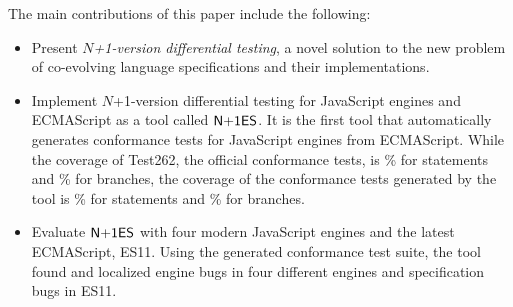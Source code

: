 The main contributions of this paper include the following:
\begin{itemize}
  \item Present \textit{$N$+1-version differential testing}, a novel solution to the new
    problem of co-evolving language specifications and their implementations.
  \item Implement $N$+1-version differential testing for JavaScript engines and
    ECMAScript as a tool called $\text{\sf N+1ES}$. It is the first tool that automatically generates conformance
    tests for JavaScript engines from ECMAScript.  While the coverage
    of Test262, the official conformance tests, is \% for statements
    and \% for branches, the coverage of the conformance tests generated by the tool
    is \% for statements and \% for branches.
  \item Evaluate $\text{\sf N+1ES}$ with four modern JavaScript engines and the latest
    ECMAScript, ES11.  Using the generated conformance test
    suite, the tool found and localized  engine bugs in four different
    engines and  specification bugs in ES11.
\end{itemize}
